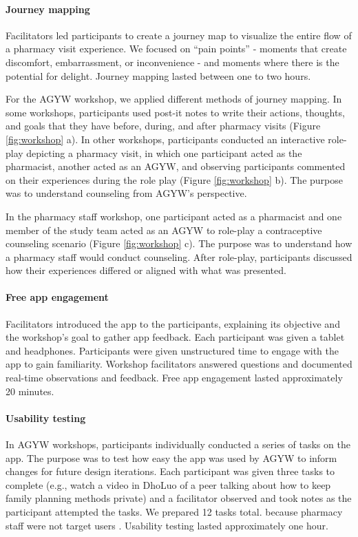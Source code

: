 \paragraph{Journey mapping}
Facilitators led participants to create a journey map to visualize the entire flow of a pharmacy visit experience. We focused on ``pain points” - moments that create discomfort, embarrassment, or inconvenience - and moments where there is the potential for delight. Journey mapping lasted between one to two hours. 

For the AGYW workshop, we applied different methods of journey mapping. In some workshops, participants used post-it notes to write their actions, thoughts, and goals that they have before, during, and after pharmacy visits (Figure \ref{fig:workshop} a). In other workshops, participants conducted an interactive role-play depicting a pharmacy visit, in which one participant acted as the pharmacist, another acted as an AGYW, and observing participants commented on their experiences during the role play (Figure \ref{fig:workshop} b). The purpose was to understand counseling from AGYW’s perspective.

In the pharmacy staff workshop, one participant acted as a pharmacist and one member of the study team acted as an AGYW to role-play a contraceptive counseling scenario (Figure \ref{fig:workshop} c). The purpose was to understand how a pharmacy staff would conduct counseling. After role-play, participants discussed how their experiences differed or aligned with what was presented.

\paragraph{Free app engagement}
Facilitators introduced the  app to the participants, explaining its objective and the workshop’s goal to gather app feedback. Each participant was given a tablet and headphones. Participants were given unstructured time to engage with the app to gain familiarity. Workshop facilitators answered questions and documented real-time observations and feedback. Free app engagement  lasted approximately 20 minutes.

\paragraph{Usability testing}
In AGYW workshops, participants individually conducted a series of tasks on the app. The purpose was to test how easy the app was used by AGYW to inform changes for future design iterations. Each participant was given three tasks to complete (e.g., watch a video in DhoLuo of a peer talking about how to keep family planning methods private) and a facilitator observed and took notes as the participant attempted the tasks. We prepared 12 tasks total.  because pharmacy staff were not target users . Usability testing lasted approximately one hour.

